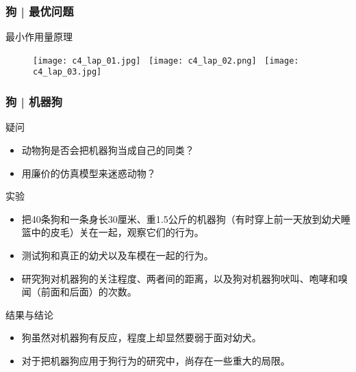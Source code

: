 \begin{frame}
  \frametitle{狗 | 最优问题}
  \begin{block}{\alert{最小作用量原理}}
    \begin{figure}
      \centering
      \texttt{[image: c4\_lap\_01.jpg]} \ 
      \texttt{[image: c4\_lap\_02.png]} \ 
      \texttt{[image: c4\_lap\_03.jpg]}
    \end{figure}
  \end{block}
\end{frame}

\begin{frame}
  \frametitle{狗 | 机器狗}
  \begin{block}{疑问}
    \begin{itemize}
      \item 动物狗是否会把机器狗当成自己的同类？
      \item 用廉价的仿真模型来迷惑动物？
    \end{itemize}
  \end{block}
  \vspace{-0.5em}
  \pause
  \begin{block}{实验}
    \begin{itemize}
      \item 把40条狗和一条身长30厘米、重1.5公斤的机器狗（有时穿上前一天放到幼犬睡篮中的皮毛）关在一起，观察它们的行为。
      \item 测试狗和真正的幼犬以及车模在一起的行为。
      \item 研究狗对机器狗的关注程度、两者间的距离，以及狗对机器狗吠叫、咆哮和嗅闻（前面和后面）的次数。
    \end{itemize}
  \end{block}
  \vspace{-0.5em}
  \pause
  \begin{block}{结果与结论}
    \begin{itemize}
      \item 狗虽然对机器狗有反应，程度上却显然要弱于面对幼犬。
      \item 对于把机器狗应用于狗行为的研究中，尚存在一些重大的局限。
    \end{itemize}
  \end{block}
\end{frame}


